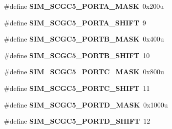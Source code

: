 \begin{DoxyCompactItemize}
\item 
\#define {\bfseries S\+I\+M\+\_\+\+S\+C\+G\+C5\+\_\+\+P\+O\+R\+T\+A\+\_\+\+M\+A\+SK}~0x200u\hypertarget{group__SIM__Register__Masks_ga9c4853233394870202cccd7844fc8a56}{}\label{group__SIM__Register__Masks_ga9c4853233394870202cccd7844fc8a56}

\item 
\#define {\bfseries S\+I\+M\+\_\+\+S\+C\+G\+C5\+\_\+\+P\+O\+R\+T\+A\+\_\+\+S\+H\+I\+FT}~9\hypertarget{group__SIM__Register__Masks_gaa7a1683eaa07a5c5adcaddf4b99ed83a}{}\label{group__SIM__Register__Masks_gaa7a1683eaa07a5c5adcaddf4b99ed83a}

\item 
\#define {\bfseries S\+I\+M\+\_\+\+S\+C\+G\+C5\+\_\+\+P\+O\+R\+T\+B\+\_\+\+M\+A\+SK}~0x400u\hypertarget{group__SIM__Register__Masks_ga5509cf72c7508dd77f0a1a9e631943e8}{}\label{group__SIM__Register__Masks_ga5509cf72c7508dd77f0a1a9e631943e8}

\item 
\#define {\bfseries S\+I\+M\+\_\+\+S\+C\+G\+C5\+\_\+\+P\+O\+R\+T\+B\+\_\+\+S\+H\+I\+FT}~10\hypertarget{group__SIM__Register__Masks_ga491c4800f5437a9e2d235a77819e434d}{}\label{group__SIM__Register__Masks_ga491c4800f5437a9e2d235a77819e434d}

\item 
\#define {\bfseries S\+I\+M\+\_\+\+S\+C\+G\+C5\+\_\+\+P\+O\+R\+T\+C\+\_\+\+M\+A\+SK}~0x800u\hypertarget{group__SIM__Register__Masks_gaac31449d101ad0d05f2bed682571be35}{}\label{group__SIM__Register__Masks_gaac31449d101ad0d05f2bed682571be35}

\item 
\#define {\bfseries S\+I\+M\+\_\+\+S\+C\+G\+C5\+\_\+\+P\+O\+R\+T\+C\+\_\+\+S\+H\+I\+FT}~11\hypertarget{group__SIM__Register__Masks_gae141a6d4af583e7410d0120442b1012f}{}\label{group__SIM__Register__Masks_gae141a6d4af583e7410d0120442b1012f}

\item 
\#define {\bfseries S\+I\+M\+\_\+\+S\+C\+G\+C5\+\_\+\+P\+O\+R\+T\+D\+\_\+\+M\+A\+SK}~0x1000u\hypertarget{group__SIM__Register__Masks_ga723a55222eb5f8fd25da5c956aa50e7b}{}\label{group__SIM__Register__Masks_ga723a55222eb5f8fd25da5c956aa50e7b}

\item 
\#define {\bfseries S\+I\+M\+\_\+\+S\+C\+G\+C5\+\_\+\+P\+O\+R\+T\+D\+\_\+\+S\+H\+I\+FT}~12\hypertarget{group__SIM__Register__Masks_gad5f267781fcedf0fcdc0c4d3607c10cb}{}\label{group__SIM__Register__Masks_gad5f267781fcedf0fcdc0c4d3607c10cb}


\end{DoxyCompactItemize}
